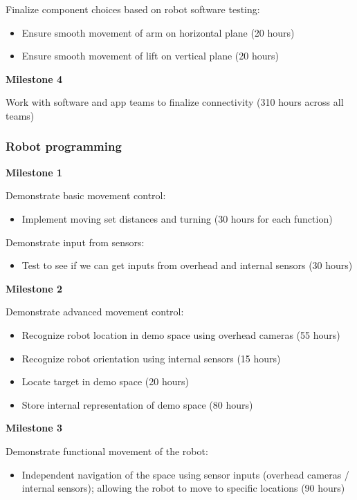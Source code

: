 \documentclass{article}
\begin{document}
Finalize component choices based on robot software testing:
\begin{itemize}
\item Ensure smooth movement of arm on horizontal plane (20 hours)
\item Ensure smooth movement of lift on vertical plane (20 hours)
\end{itemize}


{\bf Milestone 4}

Work with software and app teams to finalize connectivity (310 hours across all teams)


\subsubsection{Robot programming}

{\bf Milestone 1}

Demonstrate basic movement control:
\begin{itemize}
\item Implement moving set distances and turning (30 hours for each function)
\end{itemize}

Demonstrate input from sensors:
\begin{itemize}
\item Test to see if we can get inputs from overhead and internal sensors (30 hours)
\end{itemize}

{\bf Milestone 2}

Demonstrate advanced movement control:
\begin{itemize}
\item Recognize robot location in demo space using overhead cameras (55 hours)
\item Recognize robot orientation using internal sensors (15 hours)
\item Locate target in demo space (20 hours)
\item Store internal representation of demo space (80 hours)
\end{itemize}

{\bf Milestone 3}

Demonstrate functional movement of the robot:
\begin{itemize}
\item Independent navigation of the space using sensor inputs (overhead cameras / internal sensors); allowing the robot to move to specific locations (90 hours)
\end{itemize}
\end{document}
